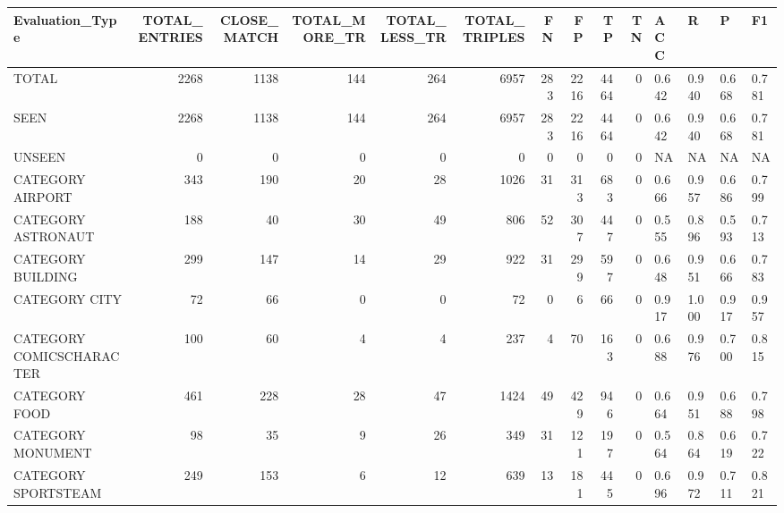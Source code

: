 \begin{tabular}{lrrrrrrrrrllll}
\hline
 Evaluation\_Type          &   TOTAL\_ENTRIES &   CLOSE\_MATCH &   TOTAL\_MORE\_TR &   TOTAL\_LESS\_TR &   TOTAL\_TRIPLES &   FN &   FP &   TP &   TN & ACC   & R     & P     & F1    \\
\hline
 TOTAL                    &            2268 &          1138 &             144 &             264 &            6957 &  283 & 2216 & 4464 &    0 & 0.642 & 0.940 & 0.668 & 0.781 \\
 SEEN                     &            2268 &          1138 &             144 &             264 &            6957 &  283 & 2216 & 4464 &    0 & 0.642 & 0.940 & 0.668 & 0.781 \\
 UNSEEN                   &               0 &             0 &               0 &               0 &               0 &    0 &    0 &    0 &    0 & NA    & NA    & NA    & NA    \\
 CATEGORY AIRPORT         &             343 &           190 &              20 &              28 &            1026 &   31 &  313 &  683 &    0 & 0.666 & 0.957 & 0.686 & 0.799 \\
 CATEGORY ASTRONAUT       &             188 &            40 &              30 &              49 &             806 &   52 &  307 &  447 &    0 & 0.555 & 0.896 & 0.593 & 0.713 \\
 CATEGORY BUILDING        &             299 &           147 &              14 &              29 &             922 &   31 &  299 &  597 &    0 & 0.648 & 0.951 & 0.666 & 0.783 \\
 CATEGORY CITY            &              72 &            66 &               0 &               0 &              72 &    0 &    6 &   66 &    0 & 0.917 & 1.000 & 0.917 & 0.957 \\
 CATEGORY COMICSCHARACTER &             100 &            60 &               4 &               4 &             237 &    4 &   70 &  163 &    0 & 0.688 & 0.976 & 0.700 & 0.815 \\
 CATEGORY FOOD            &             461 &           228 &              28 &              47 &            1424 &   49 &  429 &  946 &    0 & 0.664 & 0.951 & 0.688 & 0.798 \\
 CATEGORY MONUMENT        &              98 &            35 &               9 &              26 &             349 &   31 &  121 &  197 &    0 & 0.564 & 0.864 & 0.619 & 0.722 \\
 CATEGORY SPORTSTEAM      &             249 &           153 &               6 &              12 &             639 &   13 &  181 &  445 &    0 & 0.696 & 0.972 & 0.711 & 0.821 \\

\end{tabular}

